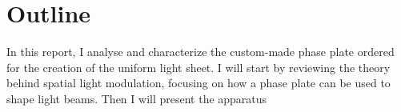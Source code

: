 \section{Outline}
In this report, I analyse and characterize the custom-made phase plate ordered for the creation of the uniform light sheet. I will start by reviewing the theory behind spatial light modulation, focusing on how a phase plate can be used to shape light beams. Then I will present the apparatus
